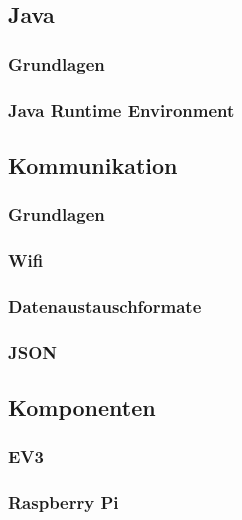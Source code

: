 \subsection{Java}

\subsubsection{Grundlagen}
\subsubsection{Java Runtime Environment}

\subsection{Kommunikation}

\subsubsection{Grundlagen}
\subsubsection{Wifi}
\subsubsection{Datenaustauschformate}
\subsubsection{JSON}

\subsection{Komponenten}

\subsubsection{EV3}
\subsubsection{Raspberry Pi}